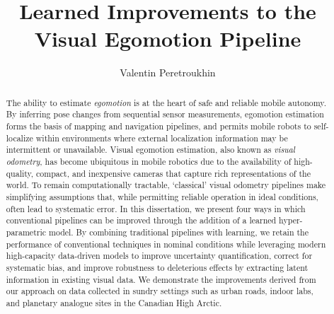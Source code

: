\documentclass[oneandahalfspaced,twoside,11pt]{ut-thesis}
\author{Valentin Peretroukhin}
\title{Learned Improvements to the Visual Egomotion Pipeline}
\begin{document}
\begin{preliminary}

\maketitle


\begin{abstract}
The ability to estimate \textit{egomotion} is at the heart of safe and reliable mobile autonomy. By inferring pose changes from sequential sensor measurements, egomotion estimation forms the basis of mapping and navigation pipelines, and permits mobile robots to self-localize within environments where external localization information may be intermittent or unavailable. 
Visual egomotion estimation, also known as \textit{visual odometry}, has become ubiquitous in mobile robotics due to the availability of high-quality, compact, and inexpensive cameras that capture rich representations of the world.
 To remain computationally tractable, `classical' visual odometry pipelines make simplifying assumptions that, while permitting reliable operation in ideal conditions, often lead to systematic error. In this dissertation, we present four ways in which conventional pipelines can be improved through the addition of a learned hyper-parametric model. By combining traditional pipelines with learning, we retain the performance of conventional techniques in nominal conditions while leveraging modern high-capacity data-driven models to improve uncertainty quantification, correct for systematic bias, and improve robustness to deleterious effects by extracting latent information in existing visual  data.
We demonstrate the improvements derived from our approach on data collected in sundry settings such as urban roads, indoor labs, and planetary analogue sites in the Canadian High Arctic.
\end{abstract}



\end{preliminary}
\end{document}

